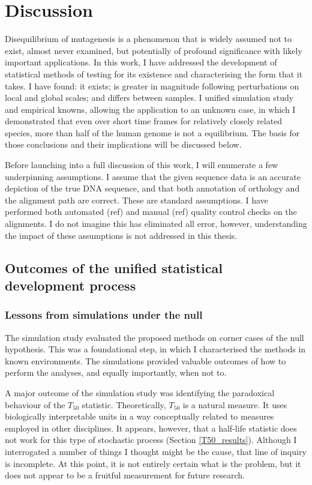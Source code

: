 \chapter{Discussion}

Disequilibrium of mutagenesis is a phenomenon that is widely assumed not to exist, almost never examined, but potentially of profound significance with likely important applications. In this work, I have addressed the development of statistical methods of testing for its existence and characterising the form that it takes. I have found: it exists; is greater in magnitude following perturbations on local and global scales; and differs between samples. I unified simulation study and empirical knowns, allowing the application to an unknown case, in which I demonstrated that even over short time frames for relatively closely related species, more than half of the human genome is not a equilibrium. The basis for those conclusions and their implications will be discussed below. 

Before launching into a full discussion of this work, I will enumerate a few underpinning assumptions. I assume that the given sequence data is an accurate depiction of the true DNA sequence, and that both annotation of orthology and the alignment path are correct. These are standard assumptions. I have performed both automated (ref) and manual (ref) quality control checks on the alignments. I do not imagine this has eliminated all error, however, understanding the impact of these assumptions is not addressed in this thesis. 

\section{Outcomes of the unified statistical development process}

\subsection{Lessons from simulations under the null}
The simulation study evaluated the proposed methods on corner cases of the null hypothesis. This was a foundational step, in which I characterised the methods in known environments. The simulations provided valuable outcomes of how to perform the analyses, and equally importantly, when not to. 

A major outcome of the simulation study was identifying the paradoxical behaviour of the $T_{50}$ statistic. Theoretically, $T_{50}$ is a natural measure. It uses biologically interpretable units in a way conceptually related to measures employed in other disciplines. It appears, however, that a half-life statistic does not work for this type of stochastic process (Section \ref{T50_results}). Although I interrogated a number of things I thought might be the cause, that line of inquiry is incomplete. At this point, it is not entirely certain what is the problem, but it does not appear to be a fruitful measurement for future research. 


